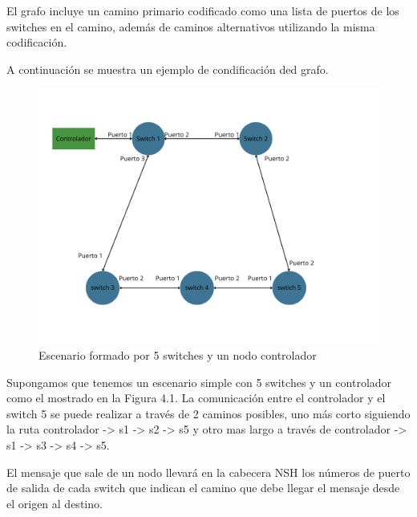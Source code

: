 \documentclass[a4paper, 12pt]{book}
\begin{document}
	El grafo incluye un camino primario codificado como una lista de puertos de los switches en el camino, además de caminos alternativos utilizando la misma codificación.
	
	A continuación se muestra un ejemplo de condificación ded grafo.
	
	\begin{figure}[H]
		\centering
		\includegraphics[width=16cm, keepaspectratio]{img/Ejemplo Periplus 1}
		\caption{Escenario formado por 5 switches y un nodo controlador}
		\label{figura:PeriplusEj1}
	\end{figure}
	
	Supongamos que tenemos un escenario simple con 5 switches y un controlador como el mostrado en la Figura 4.1. La comunicación entre el controlador y el switch 5 se puede realizar a través de 2 caminos posibles, uno más corto siguiendo la ruta controlador -> s1 -> s2 -> s5 y otro mas largo a través de controlador -> s1 -> s3 -> s4 -> s5. 
	
	El mensaje que sale de un nodo llevará en la cabecera NSH los números de puerto de salida de cada
	switch que indican el camino que debe llegar el mensaje desde el origen al destino.
	
\end{document}
